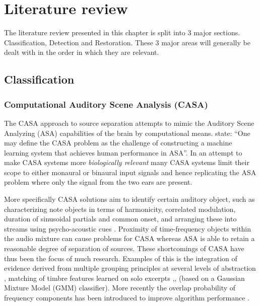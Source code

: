 \chapter{Literature review}\label{ch:LiteratureReview}

\ifpdf
    \graphicspath{{Chapter2_LitReview/Chapter2Figs/PNG/}{Chapter2_LitReview/Chapter2Figs/PDF/}{Chapter2_LitReview/Chapter2Figs/}{Chapter2_LitReview/Chapter2Figs/Classification/}{Chapter2_LitReview/Chapter2Figs/Detection/}{Chapter2_LitReview/Chapter2Figs/Restoration}}
\else
    \graphicspath{{Chapter2_LitReview/Chapter2Figs/EPS/}{Chapter2_LitReview/Chapter2Figs/}}
\fi

The literature review presented in this chapter is split into 3 major sections. Classification, Detection and Restoration. These 3 major areas will generally be dealt with in the order in which they are relevant.

\section{Classification}\label{sec:LitRev_Classification}
\subsection{Computational Auditory Scene Analysis (CASA)}
The CASA approach to source separation attempts to mimic the Auditory Scene Analyzing (ASA) capabilities of the brain by computational means. \cite{Wang2006} state: ``One may define the CASA problem as the challenge of constructing a machine learning system that achieves human performance in ASA''. In an attempt to make CASA systems more \emph{biologically relevant} many CASA systems limit their scope to either monaural or binaural input signals and hence replicating the ASA problem where only the signal from the two ears are present.

More specifically CASA solutions aim to identify certain auditory object, such as characterizing note objects in terms of harmonicity, correlated modulation, duration of sinusoidal partials and common onset, and arranging these into streams using psycho-acoustic cues \citep{Ellis1996}. Proximity of time-frequency objects within the audio mixture can cause problems for CASA whereas ASA is able to retain a reasonable degree of separation of sources. These shortcomings of CASA have thus been the focus of much research. Examples of this is the integration of evidence derived from multiple grouping principles at several levels of abstraction \citep{Godsmark1999}, matching of timbre features learned on solo excerpts \citep{Kashino1998},\citep{Kinoshita1999},\citep{Eggink2003} (based on a Gaussian Mixture Model (GMM) classifier). More recently the overlap probability of frequency components has been introduced to improve algorithm performance \citep{Sakuraba2003}.

